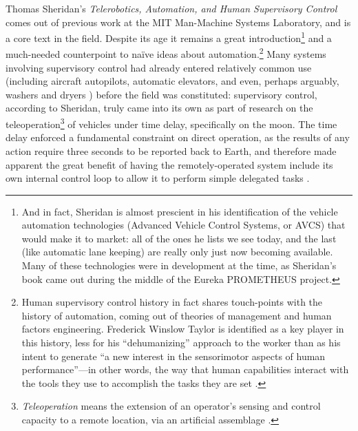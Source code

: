 
Thomas
Sheridan's \emph{Telerobotics, Automation, and Human Supervisory
  Control} comes out of previous work at the MIT Man-Machine Systems
Laboratory, and is a core text in the field. Despite its
age it remains a great introduction\footnote{And in fact, Sheridan is almost prescient in his
  identification of the vehicle automation technologies (Advanced
  Vehicle Control Systems, or AVCS) that would
  make it to market: all of the ones he lists we see today, and the
  last (like automatic lane keeping) are really only just now becoming
  available. Many of these technologies were in development at the
  time, as Sheridan's book came out during the middle of the Eureka
  PROMETHEUS project.} and a
much-needed counterpoint to na\"{i}ve ideas about automation.\footnote{Human
supervisory control history in fact 
shares touch-points with the history of automation, coming out of
theories of management and human factors 
engineering. Frederick Winslow Taylor is identified as a key player in
this history, less for his ``dehumanizing'' approach to the worker than
as
his intent to generate ``a new interest in the sensorimotor aspects of
human performance''---in other words, the way that human capabilities
interact with the tools they use to accomplish the tasks they are
set \cite[p. 7]{sheridan}.} Many systems involving supervisory
control had already entered relatively common use (including
aircraft autopilots, automatic elevators, and even, perhaps arguably,
washers and dryers \cite[p. 8]{sheridan}) before the field was
constituted:  supervisory
control, according to Sheridan, truly came into its own as part of
research on the teleoperation\footnote{\emph{Teleoperation} means the
  extension of an operator's sensing and control capacity to a remote
  location, via an artificial assemblage \cite[p. 4]{sheridan}.} of vehicles under time delay,
specifically on the moon. The time delay enforced a fundamental
constraint on direct operation, as the results of any action require
three seconds to be reported back to Earth, and therefore made
apparent the great benefit of having the remotely-operated system
include its own internal control loop to allow it to perform simple
delegated tasks \cite[p. 9]{sheridan}.


